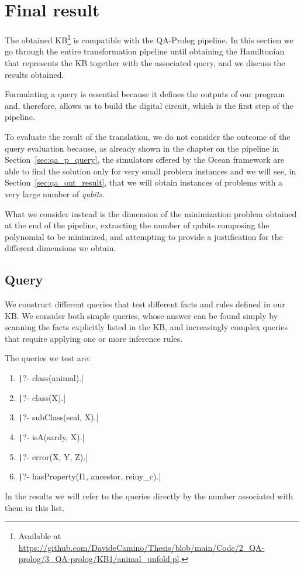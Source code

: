 \section{Final result}
The obtained KB\footnote{Available at \url{https://github.com/DavideCamino/Thesis/blob/main/Code/2_QA-prolog/3_QA-prolog/KB1/animal_unfold.pl}.} is compatible with the QA-Prolog pipeline. In this section we go through the entire transformation pipeline until obtaining the Hamiltonian that represents the KB together with the associated query, and we discuss the results obtained.

Formulating a query is essential because it defines the outputs of our program and, therefore, allows us to build the digital circuit, which is the first step of the pipeline.

To evaluate the result of the translation, we do not consider the outcome of the query evaluation because, as already shown in the chapter on the pipeline in Section~\ref{sec:qa_p_query}, the simulators offered by the Ocean framework are able to find the solution only for very small problem instances and we will see, in Section~\ref{sec:qa_ont_result}, that we will obtain instances of problems with a very large number of \emph{qubits}. 

What we consider instead is the dimension of the minimization problem obtained at the end of the pipeline, extracting the number of qubits composing the polynomial to be minimized, and attempting to provide a justification for the different dimensions we obtain.

\subsection{Query}
We construct different queries that test different facts and rules defined in our KB. We consider both simple queries, whose answer can be found simply by scanning the facts explicitly listed in the KB, and increasingly complex queries that require applying one or more inference rules.

The queries we test are:
\begin{enumerate}
	\item \texttt|?- class(animal).|
	\item \texttt|?- class(X).|
	\item \texttt|?- subClass(seal, X).|
	\item \texttt|?- isA(sardy, X).|
	\item \texttt|?- error(X, Y, Z).|	
	\item \texttt|?- hasProperty(I1, ancestor, reiny_c).|
\end{enumerate}
In the results we will refer to the queries directly by the number associated with them in this list.

